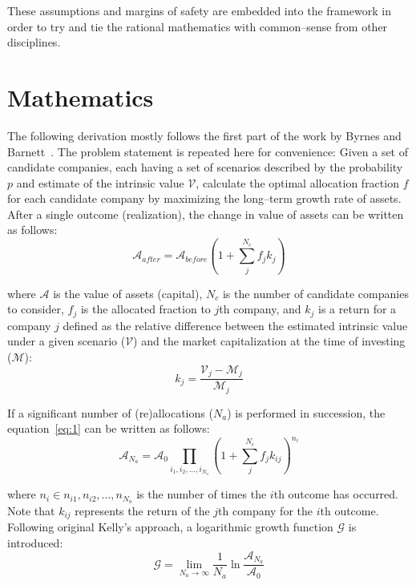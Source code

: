 \documentclass{article}
\begin{document}
These assumptions and margins of safety are embedded into the framework in order
to try and tie the rational mathematics with common--sense from other
disciplines.

\section{Mathematics}
\label{sec:mathematics}

The following derivation mostly follows the first part of the work by Byrnes and
Barnett~\cite{byrnesBarnett}. The problem statement is repeated here for
convenience: Given a set of candidate companies, each having a set of scenarios
described by the probability $p$ and estimate of the intrinsic value
$\mathcal{V}$, calculate the optimal allocation fraction $f$ for each candidate
company by maximizing the long--term growth rate of assets. After a single
outcome (realization), the change in value of assets can be written as follows:
\begin{equation}
\label{eq:1}
    \mathcal{A}_{after}
  = 
    \mathcal{A}_{before}
    \left( 1 + \sum_{j}^{N_c} f_j k_j \right)
\end{equation} 

\noindent where $\mathcal{A}$ is the value of assets (capital), $N_c$ is the
number of candidate companies to consider, $f_j$ is the allocated fraction to
$j$th company, and $k_j$ is a return for a company $j$ defined as the relative
difference between the estimated intrinsic value under a given scenario
($\mathcal{V}$) and the market capitalization at the time of investing
($\mathcal{M}$):
\begin{equation}
\label{eq:2}
    k_j = \frac{\mathcal{V}_j - \mathcal{M}_j}{\mathcal{M}_j}
\end{equation}

\noindent If a significant number of (re)allocations ($N_a$) is performed in
succession, the equation~\eqref{eq:1} can be written as follows:
\begin{equation}
\label{eq:3}
    \mathcal{A}_{N_a}
  = 
    \mathcal{A}_{0} \prod_{i_1, i_2, \hdots, i_{N_o}}
    \left( 1 + \sum_{j}^{N_c} f_j k_{ij} \right)^{n_i}
\end{equation} 

\noindent where $n_i \in {n_{i1}, n_{i2}, \hdots, n_{N_o}}$ is the number of
times the $i$th outcome has occurred. Note that $k_{ij}$ represents the return
of the $j$th company for the $i$th outcome. Following original Kelly's approach,
a logarithmic growth function $\mathcal{G}$ is introduced:
\begin{equation}
\label{eq:4}
    \mathcal{G} = \lim_{N_a \to \infty} \frac{1}{N_a} \ln
        \frac{\mathcal{A}_{N_a}}{\mathcal{A}_0}
\end{equation}
\end{document}
